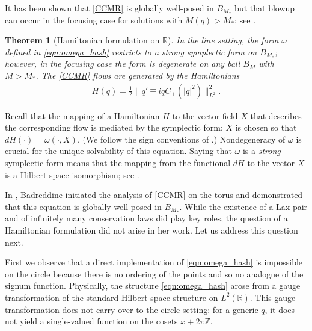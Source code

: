 \documentclass{amsart}
\numberwithin{equation}{section}
\newtheorem{theorem}{Theorem}[section]
\theoremstyle{definition}
\newcommand{\om}{\omega}
\newcommand{\Z}{\mathbb{Z}}
\newcommand{\R}{\mathbb{R}}
\begin{document}
It has been shown that \eqref{CCMR} is globally well-posed in $B_{M_*}$ but that blowup can occur in the focusing case for solutions with $M(q)>M_*$; see \cite{gerard2024calogero,MR4844677,killip2023scaling,KimKwon}.

\begin{theorem}[Hamiltonian formulation on $\R$]\label{T:R}
In the line setting, the form $\om$ defined in \eqref{eqn:omega_hash} restricts to a strong symplectic form on $B_{M_*}$; however, in the focusing case the form is degenerate on any ball $B_M$ with $M>M_*$.  The \eqref{CCMR} flows are generated by the Hamiltonians
\begin{align}
H(q)=\tfrac12\|q'\mp i qC_+(|q|^2)\|_{L^2}^2 .\label{eqn:H(q) R}
\end{align}
\end{theorem}

Recall that the mapping of a Hamiltonian $H$ to the vector field $X$ that describes the corresponding flow is mediated by the symplectic form: $X$ is chosen so that $dH(\cdot) = \omega( \cdot, X)$.  (We follow the sign conventions of \cite{MR2269239}.)  Nondegeneracy of $\omega$ is crucial for the unique solvability of this equation.  Saying that $\omega$ is a \emph{strong} symplectic form means that the mapping from the functional $dH$ to the vector $X$ is a Hilbert-space isomorphism; see \cite{chernoff2006properties}.

In \cite{badreddine2024global,Rana2}, Badreddine initiated the analysis of \eqref{CCMR} on the torus and demonstrated that this equation is globally well-posed in $B_{M_*}$.  While the existence of a Lax pair and of infinitely many conservation laws did play key roles, the question of a Hamiltonian formulation did not arise in her work.  Let us address this question next.


First we observe that a direct implementation of \eqref{eqn:omega_hash} is impossible on the circle because there is no ordering of the points and so no analogue of the signum function.  Physically, the structure \eqref{eqn:omega_hash} arose from a gauge transformation of the standard Hilbert-space structure on $L^2(\R)$.  This gauge transformation does not carry over to the circle setting: for a generic $q$, it does not yield a single-valued function on the cosets $x+2\pi\Z$.
\end{document}
